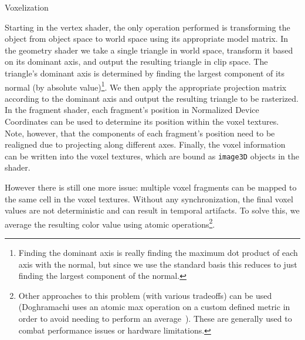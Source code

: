 \begin{algorithm}
    \caption{Voxelization}
    \label{alg:voxelization}
    \begin{algorithmic}
        \EndProcedure
    \end{algorithmic}
\end{algorithm}

Starting in the vertex shader, the only operation performed is transforming the object from object space to world space using its appropriate model matrix. In the geometry shader we take a single triangle in world space, transform it based on its dominant axis, and output the resulting triangle in clip space. The triangle's dominant axis is determined by finding the largest component of its normal (by absolute value)\footnote{Finding the dominant axis is really finding the maximum dot product of each axis with the normal, but since we use the standard basis this reduces to just finding the largest component of the normal.}. We then apply the appropriate projection matrix according to the dominant axis and output the resulting triangle to be rasterized. In the fragment shader, each fragment's position in Normalized Device Coordinates can be used to determine its position within the voxel textures. Note, however, that the components of each fragment's position need to be realigned due to projecting along different axes. Finally, the voxel information can be written into the voxel textures, which are bound as \texttt{image3D} objects in the shader.

However there is still one more issue: multiple voxel fragments can be mapped to the same cell in the voxel textures. Without any synchronization, the final voxel values are not deterministic and can result in temporal artifacts. To solve this, we average the resulting color value using atomic operations\footnote{Other approaches to this problem (with various tradeoffs) can be used (Doghramachi uses an atomic max operation on a custom defined metric in order to avoid needing to perform an average~\cite{doghramachi2013rasterized}). These are generally used to combat performance issues or hardware limitations.}.


